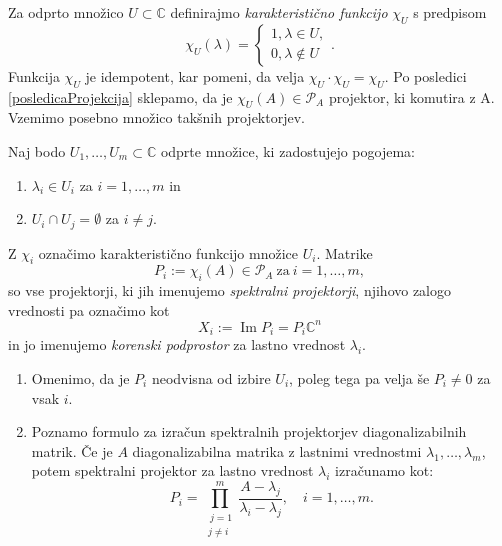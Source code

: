 \documentclass[mat1]{fmfdelo}
\newcommand{\C}{\mathbb C}
\DeclareMathOperator{\Ima}{Im}
\begin{document}
Za odprto množico $U \subset \C$ definirajmo \emph{karakteristično funkcijo} $\chi_U$ s predpisom
\begin{equation*}
    \chi_U(\lambda) =
    \begin{cases}
        1, \lambda \in U, \\
        0, \lambda \notin U
    \end{cases}.
\end{equation*}
Funkcija $\chi_U$ je idempotent, kar pomeni, da velja $\chi_U \cdot \chi_U = \chi_U$. Po posledici \ref{posledicaProjekcija} sklepamo, da je $\chi_U(A) \in \mathcal{P}_A$ projektor, ki komutira z A. Vzemimo posebno množico takšnih projektorjev.
\begin{definicija}
Naj bodo $U_1, \ldots, U_m \subset \C$ odprte množice, ki zadostujejo pogojema:
\begin{enumerate}
    \item $\lambda_i \in U_i$ za $i = 1,\ldots,m$ in
    \item $U_i \cap U_j = \emptyset$ za $i \neq j$.
\end{enumerate}
Z $\chi_i$ označimo karakteristično funkcijo množice $U_i$. Matrike
\begin{equation} \label{definicijaProjekcije}
    P_i := \chi_i(A) \in \mathcal{P}_A\ \text{za}\ i = 1,\ldots, m,
\end{equation}
so vse projektorji, ki jih imenujemo \emph{spektralni projektorji}, njihovo zalogo vrednosti pa označimo kot 
\begin{equation} \label{zalogeProjekcij}
    X_i := \Ima P_i = P_i \C^n
\end{equation}
in jo imenujemo \emph{korenski podprostor} za lastno vrednost $\lambda_i$.
\end{definicija}
\begin{opomba}
    \leavevmode
    \begin{enumerate}
        \item Omenimo, da je $P_i$ neodvisna od izbire $U_i$, poleg tega pa velja še $P_i \neq 0$ za vsak $i$.
        \item Poznamo formulo za izračun spektralnih projektorjev diagonalizabilnih matrik. Če je $A$ diagonalizabilna matrika z lastnimi vrednostmi $\lambda_1, \ldots, \lambda_m$, potem spektralni projektor za lastno vrednost $\lambda_i$ izračunamo kot:
        \begin{equation}\label{spektralniProjektorjiDiag}
            P_i = \prod_{\substack{\ j=1 \\ j \neq i}}^m \frac{A-\lambda_j}{\lambda_i-\lambda_j}, \quad i=1, \ldots, m.
        \end{equation}
    \end{enumerate}
\end{opomba}
\end{document}
